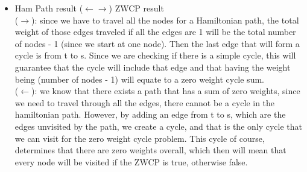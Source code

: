 \documentclass[]{article}
\begin{document}
\begin{enumerate}
\begin{itemize}
        \item Ham Path result ($\leftarrow\rightarrow$) ZWCP result\\
        ($\rightarrow$): since we have to travel all the nodes for a Hamiltonian path, the total weight of those edges traveled if all the edges are 1 will be the total number of nodes - 1 (since we start at one node). Then the last edge that will form a cycle is from t to s. Since we are checking if there is a simple cycle, this will guarantee that the cycle will include that edge and that having the weight being (number of nodes - 1) will equate to a zero weight cycle sum.\\
        ($\leftarrow$): we know that there exists a path that has a sum of zero weights, since we need to travel through all the edges, there cannot be a cycle in the hamiltonian path. However, by adding an edge from t to s, which are the edges unvisited by the path, we create a cycle, and that is the only cycle that we can visit for the zero weight cycle problem. This cycle of course, determines that there are zero weights overall, which then will mean that every node will be visited if the ZWCP is true, otherwise false.
    \end{itemize}
\end{enumerate}
\end{document}
